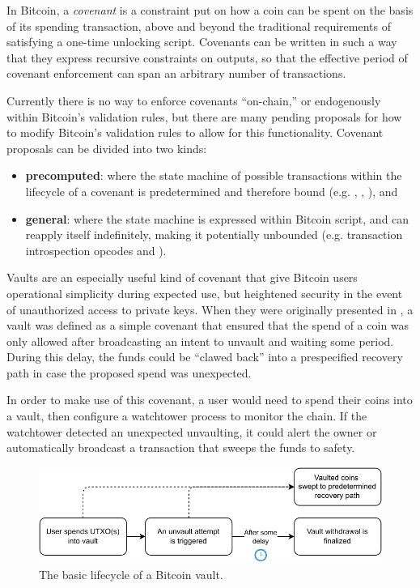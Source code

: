 \documentclass[10pt]{article}
\begin{document}
In Bitcoin, a \emph{covenant} is a constraint put on how a coin can be spent on the
basis of its spending transaction, above and beyond the traditional
requirements of satisfying a one-time unlocking script. Covenants can be written in
such a way that they express recursive constraints on outputs, so that the effective
period of covenant enforcement can span an arbitrary number of transactions. 

Currently there is no way to enforce covenants ``on-chain,'' or endogenously within
Bitcoin's validation rules, but there are many pending proposals for how to modify
Bitcoin's validation rules to allow for this functionality. Covenant proposals can be
divided into two kinds:

\begin{itemize}
  \item \textbf{precomputed}: where the state machine of possible transactions within the lifecycle
    of a covenant is predetermined and therefore bound (e.g.  \cite{CTV},
     \cite{APO},  \cite{OPTX}), and

  \item \textbf{general}: where the state machine is expressed within Bitcoin script,
    and can reapply itself indefinitely, making it potentially unbounded (e.g.
    transaction introspection opcodes and  \cite{ElementsScript}).

\end{itemize}

Vaults are an especially useful kind of covenant that give Bitcoin users operational
simplicity during expected use, but heightened security in the event of unauthorized
access to private keys. When they were originally presented in \cite{Cov}, a vault was
defined as a simple covenant that ensured that the spend of a coin was only allowed
after broadcasting an intent to unvault and waiting some period. During this delay, the
funds could be ``clawed back'' into a prespecified recovery path in case the proposed
spend was unexpected.

In order to make use of this covenant, a user would need to spend their coins into a
vault, then configure a watchtower process to monitor the chain. If the watchtower
detected an unexpected unvaulting, it could alert the owner or automatically broadcast
a transaction that sweeps the funds to safety.
 
\begin{figure}[H]
  \includegraphics[width=0.7\linewidth]{basic.pdf}
  \centering
  \caption{The basic lifecycle of a Bitcoin vault.}
\end{figure}
\end{document}
